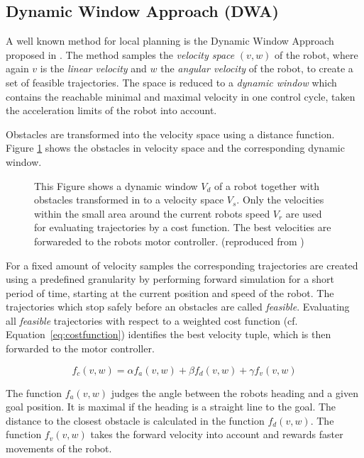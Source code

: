 \subsection{Dynamic Window Approach (DWA)}\label{sec:dwa}
A well known method for local planning is the Dynamic Window Approach proposed in \cite{DWA1997}. 
The method samples the \emph{velocity space} $(v,w)$ of the robot, where again $v$ is the \emph{linear velocity} and $w$ the \emph{angular velocity} of the robot, to create a set of feasible trajectories.
The space is reduced to a \emph{dynamic window} which contains the reachable minimal and maximal velocity in one control cycle, taken the acceleration limits of the robot into account.

Obstacles are transformed into the velocity space using a distance function.
Figure \ref{fig:fig_dynamic} shows the obstacles in velocity space and the corresponding dynamic window. 
\begin{figure}[thpb]
	  \myfloatalign
      \scriptsize
      \centering
    \subfloat
    {  
       \def\svgwidth{0.75\textwidth}
       
    } 
   \caption[Dynamic Window]{This Figure shows a dynamic window $V_d$ of a robot together with obstacles transformed in to a velocity space $V_s$. Only the velocities within the small area around the current robots speed $V_r$ are used for evaluating trajectories by a cost function. The best velocities are forwareded to the robots motor controller. (reproduced from \cite{DWA1997})}
   \label{fig:fig_dynamic}
\end{figure}


For a fixed amount of velocity samples the corresponding trajectories are created using a predefined granularity by performing forward simulation for a short period of time, starting at the current position and speed of the robot. 
The trajectories which stop safely before an obstacles are called \emph{feasible}.
Evaluating all \emph{feasible} trajectories with respect to a weighted cost function (cf. Equation~\ref{eq:costfunction}) identifies the best velocity tuple, which is then forwarded to the motor controller.

\begin{equation}
   f_c(v,w)=\alpha f_a(v,w)+\beta f_d(v,w)+\gamma f_v(v,w)
   \label{eq:costfunction}
\end{equation}

The function $f_a(v,w)$ judges the angle between the robots heading and a given goal position.
It is maximal if the heading is a straight line to the goal.
The distance to the closest obstacle is calculated in the function $f_d(v,w)$.
The function $f_v(v,w)$ takes the forward velocity into account and rewards faster movements of the robot.

